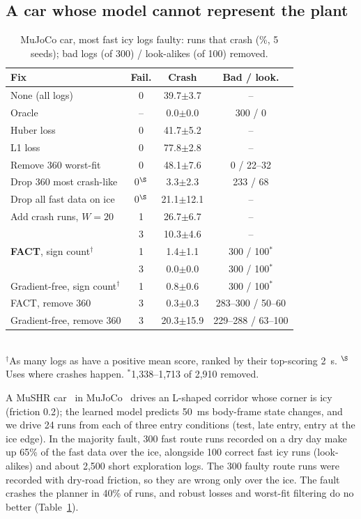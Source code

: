 \documentclass[preprint,12pt]{elsarticle}
\newcommand{\method}{FACT}
\newcommand{\pmse}[2]{#1{\scriptsize$\pm$#2}}
\begin{document}
\subsection{A car whose model cannot represent the plant}\label{sec:car}

\begin{table}[t]
\caption{MuJoCo car, most fast icy logs faulty: runs that crash (\%, 5 seeds); bad logs (of 300) / look-alikes (of 100) removed.}
\label{tab:mj}
\centering\footnotesize
\setlength{\tabcolsep}{4pt}
\begin{tabular}{@{}lccc@{}}
\toprule
Fix & Fail. & Crash & Bad / look. \\
\midrule
None (all logs) & 0 & \pmse{39.7}{3.7} & -- \\
Oracle & -- & \pmse{0.0}{0.0} & 300 / 0 \\
Huber loss & 0 & \pmse{41.7}{5.2} & -- \\
L1 loss & 0 & \pmse{77.8}{2.8} & -- \\
Remove 360 worst-fit & 0 & \pmse{48.1}{7.6} & 0 / 22--32 \\
Drop 360 most crash-like & 0$^\S$ & \pmse{3.3}{2.3} & 233 / 68 \\
Drop all fast data on ice & 0$^\S$ & \pmse{21.1}{12.1} & -- \\
Add crash runs, $W=20$ & 1 & \pmse{26.7}{6.7} & -- \\
 & 3 & \pmse{10.3}{4.6} & -- \\
\textbf{\method{}}, sign count$^\dagger$ & 1 & \pmse{1.4}{1.1} & 300 / 100$^\ast$ \\
 & 3 & \pmse{0.0}{0.0} & 300 / 100$^\ast$ \\
Gradient-free, sign count$^\dagger$ & 1 & \pmse{0.8}{0.6} & 300 / 100$^\ast$ \\
\method{}, remove 360 & 3 & \pmse{0.3}{0.3} & 283--300 / 50--60 \\
Gradient-free, remove 360 & 3 & \pmse{20.3}{15.9} & 229--288 / 63--100 \\
\bottomrule
\end{tabular}\\[2pt]
\footnotesize $^\dagger$As many logs as have a positive mean score, ranked by their top-scoring 2~s. $^\S$Uses where crashes happen. $^\ast$1,338--1,713 of 2,910 removed.
\end{table}

A MuSHR car~\citep{srinivasa2019mushr} in MuJoCo~\citep{todorov2012mujoco} drives an L-shaped corridor whose corner is icy (friction 0.2); the learned model predicts 50~ms body-frame state changes, and we drive 24 runs from each of three entry conditions (test, late entry, entry at the ice edge). In the majority fault, 300 fast route runs recorded on a dry day make up 65\% of the fast data over the ice, alongside 100 correct fast icy runs (look-alikes) and about 2,500 short exploration logs. The 300 faulty route runs were recorded with dry-road friction, so they are wrong only over the ice. The fault crashes the planner in 40\% of runs, and robust losses and worst-fit filtering do no better (Table~\ref{tab:mj}).
\end{document}
